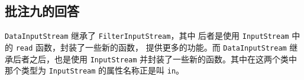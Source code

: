 
\subsection{批注九的回答}
\label{sec:fix:bl9}

\lstinline|DataInputStream| 继承了 \lstinline|FilterInputStream|，其中 后者是使用 \lstinline|InputStream| 中的 \lstinline|read| 函数，封装了一些新的函数，
提供更多的功能。而 \lstinline|DataInputStream| 继承后者之后，也是使用 \lstinline|InputStream| 并封装了一些新的函数。其中在这两个类中那个类型为 \lstinline|InputStream|
的属性名称正是叫 \lstinline|in|。
